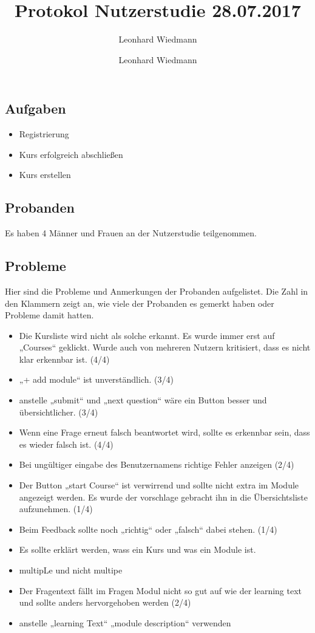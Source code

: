\documentclass[colorback, accentcolor=tud1c, paper=a4]{tudexercise}
\title{Protokol Nutzerstudie 28.07.2017}
\subtitle{Leonhard Wiedmann}
\author{Leonhard Wiedmann}
\begin{document}
\maketitle
\subsection*{Aufgaben}
	\begin{itemize}
	\item Registrierung
  \item Kurs erfolgreich abschließen
  \item Kurs erstellen
	\end{itemize}

\subsection*{Probanden}
Es haben 4 Männer und Frauen an der Nutzerstudie teilgenommen.

\subsection*{Probleme}
  Hier sind die Probleme und Anmerkungen der Probanden aufgelistet. Die Zahl in den Klammern zeigt an, wie viele der Probanden es gemerkt haben oder Probleme damit hatten.
  \begin{itemize}
    \item Die Kursliste wird nicht als solche erkannt. Es wurde immer erst auf „Courses“ geklickt. Wurde auch von mehreren Nutzern kritisiert, dass es nicht klar erkennbar ist. (4/4)
    \item „+ add module“ ist unverständlich. (3/4)
    \item anstelle „submit“ und „next question“ wäre ein Button besser und übersichtlicher. (3/4)
    \item Wenn eine Frage erneut falsch beantwortet wird, sollte es erkennbar sein, dass es wieder falsch ist. (4/4)
    \item Bei ungültiger eingabe des Benutzernamens richtige Fehler anzeigen (2/4)
    \item Der Button „start Course“ ist verwirrend und sollte nicht extra im Module angezeigt werden. Es wurde der vorschlage gebracht ihn in die Übersichtsliste aufzunehmen. (1/4)
    \item Beim Feedback sollte noch „richtig“ oder „falsch“ dabei stehen. (1/4)
    \item Es sollte erklärt werden, wass ein Kurs und was ein Module ist.
    \item multipLe und nicht multipe
    \item Der Fragentext fällt im Fragen Modul nicht so gut auf wie der learning text und sollte anders hervorgehoben werden (2/4)
    \item anstelle „learning Text“ „module description“ verwenden
   \end{itemize}
\end{document}
